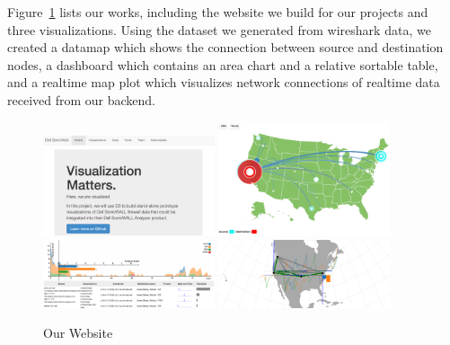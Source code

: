 \documentclass[paper=a4, fontsize=11pt]{report} %
\begin{document}
\begin{description}[style=nextline]
    \item[\href{http://sjengle.cs.usfca.edu/cs690-sonicwall/deliverables.html}{Our Visualizations}]
    Figure~\ref{fig:visuals} lists our works, including the website we build for our projects and three visualizations. Using the dataset we generated from wireshark data, we created a datamap which shows the connection between source and destination nodes, a dashboard which contains an area chart and a relative sortable table, and a realtime map plot which visualizes network connections of realtime data received from our backend.

    \begin{figure}[H]
        \begin{center}
            \includegraphics[width=0.45\textwidth]{website.png}
            \includegraphics[width=0.45\textwidth]{datamap.png}
            \includegraphics[width=0.45\textwidth]{dashboard.png}
            \includegraphics[width=0.45\textwidth]{realtime.png}
        \end{center}
        \caption{Our Website}\label{fig:visuals}
    \end{figure}

\end{description}
\end{document}
